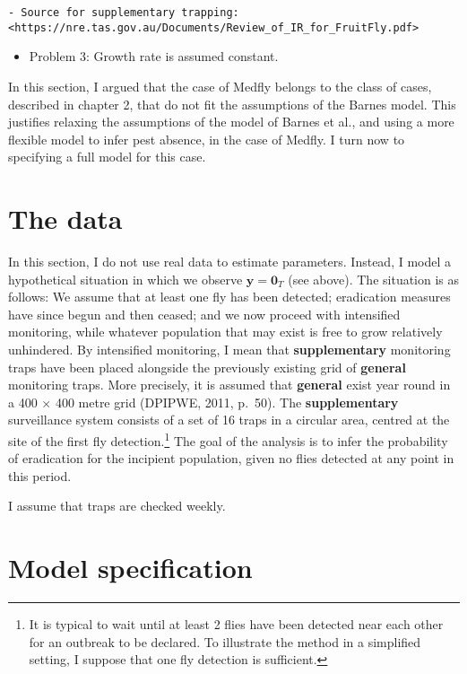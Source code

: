 \documentclass[
]{book}
\providecommand{\tightlist}{%
  \setlength{\itemsep}{0pt}\setlength{\parskip}{0pt}}
\begin{document}
\begin{verbatim}
- Source for supplementary trapping: <https://nre.tas.gov.au/Documents/Review_of_IR_for_FruitFly.pdf>
\end{verbatim}

\begin{itemize}
\tightlist
\item
  Problem 3: Growth rate is assumed constant.
\end{itemize}

In this section, I argued that the case of Medfly belongs to the class of cases, described in chapter 2, that do not fit the assumptions of the Barnes model. This justifies relaxing the assumptions of the model of Barnes et al., and using a more flexible model to infer pest absence, in the case of Medfly. I turn now to specifying a full model for this case.

\hypertarget{the-data}{%
\section{The data}\label{the-data}}

In this section, I do not use real data to estimate parameters. Instead, I model a hypothetical situation in which we observe \(\mathbf y = \mathbf 0_T\) (see above). The situation is as follows: We assume that at least one fly has been detected; eradication measures have since begun and then ceased; and we now proceed with intensified monitoring, while whatever population that may exist is free to grow relatively unhindered. By intensified monitoring, I mean that \textbf{supplementary} monitoring traps have been placed alongside the previously existing grid of \textbf{general} monitoring traps. More precisely, it is assumed that \textbf{general} exist year round in a 400 \(\times\) 400 metre grid (DPIPWE, 2011, p.~50). The \textbf{supplementary} surveillance system consists of a set of 16 traps in a circular area, centred at the site of the first fly detection.\footnote{It is typical to wait until at least 2 flies have been detected near each other for an outbreak to be declared. To illustrate the method in a simplified setting, I suppose that one fly detection is sufficient.} The goal of the analysis is to infer the probability of eradication for the incipient population, given no flies detected at any point in this period.

I assume that traps are checked weekly.

\hypertarget{model-specification-2}{%
\section{Model specification}\label{model-specification-2}}
\end{document}
